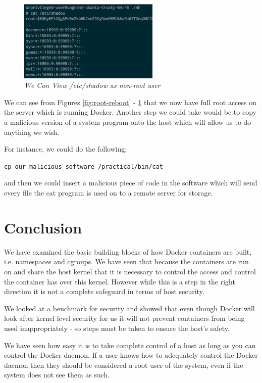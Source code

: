 \documentclass{article}
\begin{document}
\begin{figure}[!h]
\centering
\includegraphics*[width=0.6\textwidth]{components/images/root-shadow}
\caption{\em We Can View /etc/shadow as non-root user}
\label{fig:root-shadow}
\end{figure}

We can see from Figures \ref{fig:root-reboot} - \ref{fig:root-shadow} that we now have full root access on the server which is running Docker. Another step we could take would be to copy a malicious version of a system program onto the host which will allow us to do anything we wish. 

For instance, we could do the following:

\texttt{cp our-malicious-software /practical/bin/cat}

and then we could insert a malicious piece of code in the software which will send every file the cat program is used on to a remote server for storage.

\newpage
\section{Conclusion}
\label{sec:Conclusion}
We have examined the basic building blocks of how Docker containers are built, i.e. namespaces and cgroups. We have seen that because the containers are run on and share the host kernel that it is necessary to control the access and control the container has over this kernel. However while this is a step in the right direction it is not a complete safeguard in terms of host security. 

We looked at a benchmark for security and showed that even though Docker will look after kernel level security for us it will not prevent containers from being used inappropriately - so steps must be taken to ensure the host's safety.

We have seen how easy it is to take complete control of a host as long as you can control the Docker daemon. If a user knows how to adequately control the Docker daemon then they should be considered a root user of the system, even if the system does not see them as such.
\end{document}
